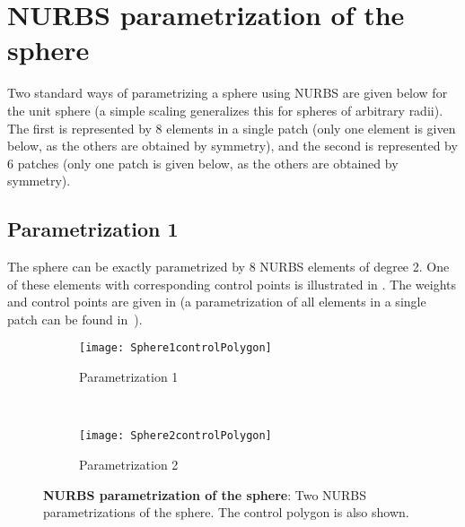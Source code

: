 \section{NURBS parametrization of the sphere}
Two standard ways of parametrizing a sphere using NURBS are given below for the unit sphere (a simple scaling generalizes this for spheres of arbitrary radii). The first is represented by 8 elements in a single patch (only one element is given below, as the others are obtained by symmetry), and the second is represented by 6 patches (only one patch is given below, as the others are obtained by symmetry).
\subsection{Parametrization 1}
\label{Sec3:NURBSsphere1}
The sphere can be exactly parametrized by 8 NURBS elements of degree 2. One of these elements with corresponding control points is illustrated in . The weights and control points are given in  (a parametrization of all elements in a single patch can be found in~\cite[p. 168]{Venas2015iao}).
\begin{figure}
	\centering
	\begin{subfigure}{0.40\textwidth}
		\centering
		\texttt{[image: Sphere1controlPolygon]}
		\caption{Parametrization 1}
		\label{Fig3:parametrizationOfSphere1} 
	\end{subfigure}
	~
	\begin{subfigure}{0.55\textwidth}
		\centering
		\texttt{[image: Sphere2controlPolygon]}
		\caption{Parametrization 2}
		\label{Fig3:parametrizationOfSphere2} 
	\end{subfigure}
	\caption{\textbf{NURBS parametrization of the sphere}: Two NURBS parametrizations of the sphere. The control polygon is also shown.}       
\end{figure}

